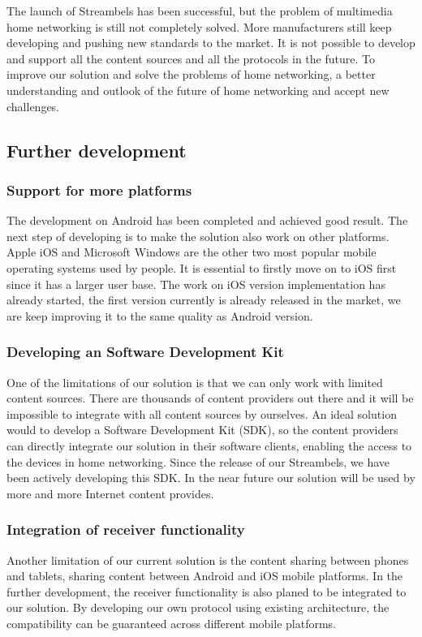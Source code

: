 
The launch of Streambels has been successful, but the problem of multimedia home networking is still not completely solved. More manufacturers still keep developing and pushing new standards to the market. It is not possible to develop and support all the content sources and all the protocols in the future. To improve our solution and solve the problems of home networking, a better understanding and outlook of the future of home networking and accept new challenges.

\subsection{Further development}
\subsubsection{Support for more platforms}
The development on Android has been completed and achieved good result. The next step of developing is to make the solution also work on other platforms. Apple iOS and Microsoft Windows are the other two most popular mobile operating systems used by people. It is essential to firstly move on to iOS first since it has a larger user base. The work on iOS version implementation has already started, the first version currently is already released in the market, we are keep improving it to the same quality as Android version.
\subsubsection{Developing an Software Development Kit}
One of the limitations of our solution is that we can only work with limited content sources. There are thousands of content providers out there and it will be impossible to integrate with all content sources by ourselves. An ideal solution would to develop a Software Development Kit (SDK), so the content providers can directly integrate our solution in their software clients, enabling the access to the devices in home networking. Since the release of our Streambels, we have been actively developing this SDK. In the near future our solution will be used by more and more Internet content provides.
\subsubsection{Integration of receiver functionality}
Another limitation of our current solution is the content sharing between phones and tablets, sharing content between Android and iOS mobile platforms. In the further development, the receiver functionality is also planed to be integrated to our solution. By developing our own protocol using existing architecture, the compatibility can be guaranteed across different mobile platforms.
